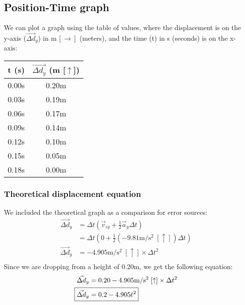 \documentclass[a4paper,12pt]{article}
\begin{document}
	\subsection{Position-Time graph}
	We can plot a graph using the table of values, where the displacement is on the y-axis ($\vec{\Delta d}_y$) in $\text{m} \,[\rightarrow]$ (meters), and the time (t) in s (seconds) is on the x-axis:
	\bigskip
	\bigskip
	\begin{center}
		\begin{tabular}{ |c|c| } 
			\hline
			t (s) & $\vec{\Delta d_y}$ (m [$\uparrow$]) \\ 
			\hline\hline
			0.00s & 0.20m \\
			\hline 
			0.03s & 0.19m \\ 
			\hline
			0.06s & 0.17m \\
			\hline
			0.09s & 0.14m \\
			\hline
			0.12s & 0.10m \\
			\hline
			0.15s & 0.05m \\
			\hline
			0.18s & 0.00m \\
			\hline
		\end{tabular} 
	\end{center}
	\bigskip
	\bigskip
	\bigskip
	\subsubsection{Theoretical displacement equation}
	We included the theoretical graph as a comparison for error sources:
	\begin{align*}
		\vec{\Delta d}_y&=\Delta t\left(\vec{v}_{iy}+\frac{1}{2}\vec{a}_y\Delta t\right)\\
		&=\Delta t\left(0+\frac{1}{2}(-9.81 \text{m}/\text{s}^2\;[\uparrow])\Delta t\right)\\
		\vec{\Delta d}_y&=-4.905 \text{m}/\text{s}^2\;[\uparrow]\times\Delta t^2\\
	\end{align*}
	Since we are dropping from a height of 0.20m, we get the following equation:
	\begin{align*}
		\vec{\Delta d}_y&=0.20-4.905 \text{m}/\text{s}^2\;[\uparrow]\times\Delta t^2\\
		\Aboxed{\vec{\Delta d}_y&=0.2-4.905t^2}
	\end{align*}
	
\end{document}
